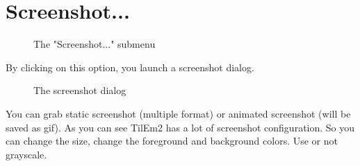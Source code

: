 \documentclass[10pt]{report}
\begin{document}
\section{Screenshot...}
\begin{figure}[H]
\centering
{}
\caption{The "Screenshot..." submenu}
\end{figure}
By clicking on this option, you launch a screenshot dialog.\newline

\begin{figure}[H]
\centering
{}
\caption{The screenshot dialog}
\end{figure}
You can grab static screenshot (multiple format) or animated screenshot (will be saved as gif).\newline
As you can see TilEm2 has a lot of screenshot configuration.\newline
So you can change the size, change the foreground and background colors.\newline
Use or not grayscale.\newline
\end{document}
